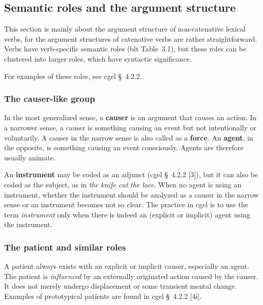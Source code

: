 \documentclass{article}
\newcommand*{\citesec}[1]{\S~{#1}}
\newcommand*{\citetable}[1]{Table~{#1}}
\newcommand*{\concept}[1]{\textbf{#1}}
\newcommand*{\term}[1]{\emph{#1}}
\newcommand*{\corpus}[1]{\emph{#1}}
\begin{document}

\subsection{Semantic roles and the argument structure}

This section is mainly about the argument structure of non-catenative lexical verbs,
for the argument structures of catenative verbs are rather straightforward.
Verbs have verb-specific semantic roles (\ac{blt} \citetable{3.1}),
but these roles can be clustered into larger roles,
which have syntactic significance. %

For examples of these roles, see \ac{cgel} \citesec{4.2.2}.



\subsubsection{The causer-like group}

In the most generalized sense,
a \concept{causer} is an argument that causes an action. 
In a narrower sense, a causer is something causing an event but not intentionally or voluntarily.
A causer in the narrow sense is also called as a \concept{force}.
An \concept{agent}, in the opposite, is something causing an event consciously.
Agents are therefore usually animate.

An \concept{instrument} may be coded as an adjunct (\ac{cgel} \citesec{4.2.2} [3]),
but it can also be coded as the subject, 
as in \corpus{the knife cut the lace}.
When no agent is using an instrument, 
whether the instrument should be analyzed as a causer in the narrow sense or an instrument
becomes not so clear.
The practice in \ac{cgel} is to use the term \term{instrument} only when 
there is indeed an (explicit or implicit) agent using the instrument.

\subsubsection{The patient and similar roles}

A patient always exists with an explicit or implicit causer, especially an agent.
The patient is \emph{influenced} by an externally originated action caused by the causer.
It does not merely undergo displacement or some transient mental change. 
Examples of prototypical patients are found in \ac{cgel} \citesec{4.2.2} [4i].
\end{document}
